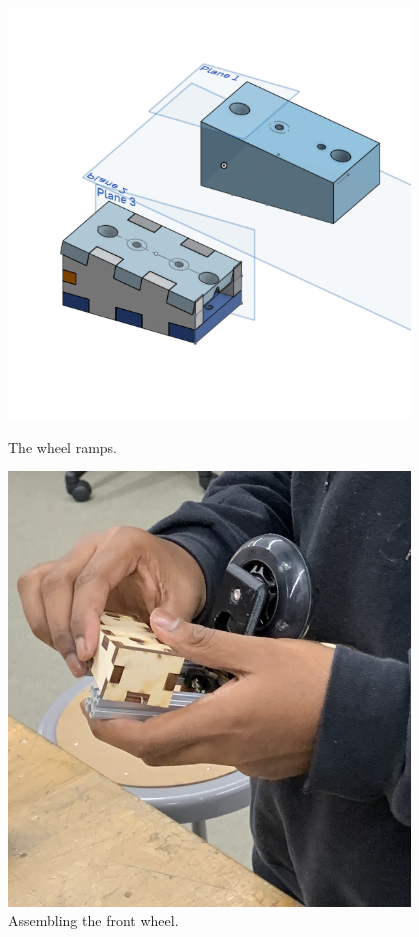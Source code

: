 

\begin{figure}[ht]
\centering
\begin{minipage}[b]{.48\textwidth}
  \centering
  \includegraphics[width=0.95\textwidth]{Meetings/October/10-11-21/10-11-21_Hardware_Figure1 - Nathan Forrer.PNG}
  \caption{The wheel ramps.}
  \label{fig:pic1}
\end{minipage}%
\hfill%
\begin{minipage}[b]{.48\textwidth}
  \centering
  \includegraphics[width=0.95\textwidth]{Meetings/October/10-11-21/10-11-21_Hardware_Figure2 - Nathan Forrer.jpg}
  \caption{Assembling the front wheel.}
  \label{fig:pic2}
\end{minipage}
\end{figure}

